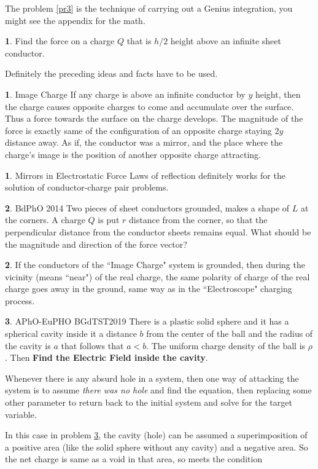 \documentclass[11pt,a4paper,landscape,twocolumn]{article}
\theoremstyle{definition}
\newtheorem{fct}{ \framebox[0.05\textwidth]{{\sffamily Fact}} }
\theoremstyle{definition}
\newtheorem{pr}{ \framebox[0.05\textwidth]{{\sffamily Pr}} }
\theoremstyle{definition}
\newtheorem{idea}{ \framebox[0.05\textwidth]{{\sffamily Idea}} }
\theoremstyle{definition}
\begin{document}
{\small The problem \ref{pr3} is the technique of carrying out a Genius integration, you might see the appendix for the math.}
\begin{pr}
Find the force on a charge $Q$ that is $h/2$ height above an infinite sheet conductor.
\end{pr}
Definitely the preceding ideas and facts have to be used.
\begin{fct}{\sffamily Image Charge}
If any charge is above an infinite conductor by $y$ height, then the charge causes opposite charges to come and accumulate over the surface. Thus a force towards the surface on the charge develops. The magnitude of the force is exactly same of the configuration of an opposite charge staying $2y$ distance away. As if, the conductor was a mirror, and the place where the charge's image is the position of another opposite charge attracting. 
\end{fct}
\begin{idea}{\sffamily Mirrors in Electrostatic Force}
Laws of reflection definitely works for the solution of conductor-charge pair problems.
\end{idea}
%
\begin{pr}{\sffamily BdPhO 2014}
Two pieces of sheet conductors grounded, makes a shape of $L$ at the corners. A charge $Q$ is put $r$ distance from the corner, so that the perpendicular distance from the conductor sheets remains equal. What should be the magnitude and direction of the force vector?
\end{pr}
\begin{fct}
If the conductors of the ``Image Charge" system is grounded, then during the vicinity (means ``near") of the real charge, the same polarity of charge of the real charge goes away in the ground, same way as in the ``Electroscope" charging process.
\end{fct}

\begin{pr} \label{pr4}
\textsf{APhO-EuPHO BGdTST2019} There is a plastic solid sphere and it has a spherical cavity inside it a distance $b$ from the center of the ball and the radius of the cavity is $a$ that follows that $a <b$. The uniform charge density of the ball is $\rho$. Then \textbf{Find the Electric Field inside the cavity}.
\end{pr}

{\small Whenever there is any absurd hole in a system, then one way of attacking the system is to assume \emph{there was no hole} and find the equation, then replacing some other parameter to return back to the initial system and solve for the target variable. 

In this case in problem \ref{pr4}, the cavity (hole) can be assumed a superimposition of a positive area (like the solid sphere without any cavity) and a negative area. So the net charge is same as a void in that area, so meets the condition}
\end{document}

